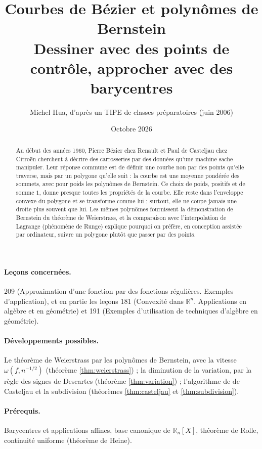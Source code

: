 \documentclass[11pt,a4paper]{article}
\title{Courbes de Bézier et polynômes de Bernstein\\[2pt]
\large Dessiner avec des points de contrôle, approcher avec des barycentres}
\author{Michel Hua, d'après un TIPE de classes préparatoires (juin 2006)}
\date{Octobre 2026}
\theoremstyle{plain}
\theoremstyle{definition}
\theoremstyle{remark}
\newcommand{\R}{\mathbb{R}}
\begin{document}
\maketitle

\begin{abstract}
Au début des années 1960, Pierre Bézier chez Renault et Paul de Casteljau chez Citroën cherchent à décrire des carrosseries par des données qu'une machine sache manipuler. Leur réponse commune est de définir une courbe non par des points qu'elle traverse, mais par un polygone qu'elle suit : la courbe est une moyenne pondérée des sommets, avec pour poids les polynômes de Bernstein. Ce choix de poids, positifs et de somme $1$, donne presque toutes les propriétés de la courbe. Elle reste dans l'enveloppe convexe du polygone et se transforme comme lui ; surtout, elle ne coupe jamais une droite plus souvent que lui. Les mêmes polynômes fournissent la démonstration de Bernstein du théorème de Weierstrass, et la comparaison avec l'interpolation de Lagrange (phénomène de Runge) explique pourquoi on préfère, en conception assistée par ordinateur, suivre un polygone plutôt que passer par des points.
\end{abstract}

\paragraph{Leçons concernées.} 209 (Approximation d'une fonction par des fonctions régulières. Exemples d'application), et en partie les leçons 181 (Convexité dans $\R^n$. Applications en algèbre et en géométrie) et 191 (Exemples d'utilisation de techniques d'algèbre en géométrie).

\paragraph{Développements possibles.} Le théorème de Weierstrass par les polynômes de Bernstein, avec la vitesse $\omega(f,n^{-1/2})$ (théorème \ref{thm:weierstrass}) ; la diminution de la variation, par la règle des signes de Descartes (théorème \ref{thm:variation}) ; l'algorithme de de Casteljau et la subdivision (théorèmes \ref{thm:casteljau} et \ref{thm:subdivision}).

\paragraph{Prérequis.} Barycentres et applications affines, base canonique de $\R_n[X]$, théorème de Rolle, continuité uniforme (théorème de Heine).
\end{document}
